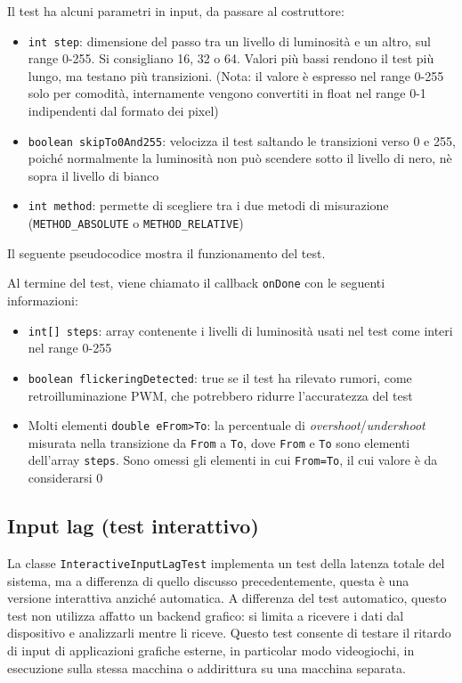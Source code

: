Il test ha alcuni parametri in input, da passare al costruttore:\begin{itemize}
	\item \texttt{int step}: dimensione del passo tra un livello di luminosità e un altro, sul range 0-255. Si consigliano 16, 32 o 64. Valori più bassi rendono il test più lungo, ma testano più transizioni. (Nota: il valore è espresso nel range 0-255 solo per comodità, internamente vengono convertiti in float nel range 0-1 indipendenti dal formato dei pixel)
	\item \texttt{boolean skipTo0And255}: velocizza il test saltando le transizioni verso 0 e 255, poiché normalmente la luminosità non può scendere sotto il livello di nero, nè sopra il livello di bianco
	\item \texttt{int method}: permette di scegliere tra i due metodi di misurazione (\texttt{METHOD\_ABSOLUTE} o \texttt{METHOD\_RELATIVE})
\end{itemize}

Il seguente pseudocodice mostra il funzionamento del test.


Al termine del test, viene chiamato il callback \texttt{onDone} con le seguenti informazioni:\begin{itemize}
	\item \texttt{int[] steps}: array contenente i livelli di luminosità usati nel test come interi nel range 0-255
	\item \texttt{boolean flickeringDetected}: true se il test ha rilevato rumori, come retroilluminazione PWM, che potrebbero ridurre l'accuratezza del test
	\item Molti elementi \texttt{double eFrom>To}: la percentuale di \textit{overshoot}/\textit{undershoot} misurata nella transizione da \texttt{From} a \texttt{To}, dove \texttt{From} e \texttt{To} sono elementi dell'array \texttt{steps}. Sono omessi gli elementi in cui \texttt{From=To}, il cui valore è da considerarsi 0
\end{itemize}

\subsection{Input lag (test interattivo)}
La classe \texttt{InteractiveInputLagTest} implementa un test della latenza totale del sistema, ma a differenza di quello discusso precedentemente, questa è una versione interattiva anziché automatica. A differenza del test automatico, questo test non utilizza affatto un backend grafico: si limita a ricevere i dati dal dispositivo e analizzarli mentre li riceve. Questo test consente di testare il ritardo di input di applicazioni grafiche esterne, in particolar modo videogiochi, in esecuzione sulla stessa macchina o addirittura su una macchina separata.

